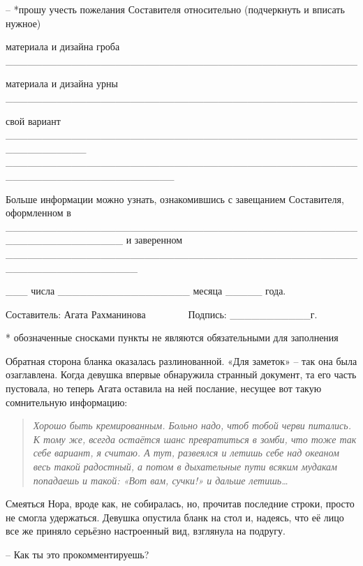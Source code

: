 \documentclass[
  a5paperpaper,
  DIV=11,
  numbers=noendperiod]{scrreprt}
\begin{document}
-- *прошу учесть пожелания Составителя относительно (подчеркнуть и
вписать нужное)

материала и дизайна гроба
\_\_\_\_\_\_\_\_\_\_\_\_\_\_\_\_\_\_\_\_\_\_\_\_\_\_\_\_\_\_\_\_\_\_\_\_\_\_\_\_\_\_\_\_\_\_\_\_

материала и дизайна урны
\_\_\_\_\_\_\_\_\_\_\_\_\_\_\_\_\_\_\_\_\_\_\_\_\_\_\_\_\_\_\_\_\_\_\_\_\_\_\_\_\_\_\_\_\_\_\_\_

свой вариант
\_\_\_\_\_\_\_\_\_\_\_\_\_\_\_\_\_\_\_\_\_\_\_\_\_\_\_\_\_\_\_\_\_\_\_\_\_\_\_\_\_\_\_\_\_\_\_\_\_\_\_\_\_\_\_\_\_\_\_
\_\_\_\_\_\_\_\_\_\_\_\_\_\_\_\_\_\_\_\_\_\_\_\_\_\_\_\_\_\_\_\_\_\_\_\_\_\_\_\_\_\_\_\_\_\_\_\_\_\_\_\_\_\_\_\_\_\_\_\_\_\_\_\_\_\_\_\_\_\_\_

Больше информации можно узнать, ознакомившись с завещанием Составителя,
оформленном в
\_\_\_\_\_\_\_\_\_\_\_\_\_\_\_\_\_\_\_\_\_\_\_\_\_\_\_\_\_\_\_\_\_\_\_\_\_\_\_\_\_\_\_\_\_\_\_\_\_\_\_\_\_\_\_\_\_\_\_\_\_\_\_\_
и заверенном
\_\_\_\_\_\_\_\_\_\_\_\_\_\_\_\_\_\_\_\_\_\_\_\_\_\_\_\_\_\_\_\_\_\_\_\_\_\_\_\_\_\_\_\_\_\_\_\_\_\_\_\_\_\_\_\_\_\_\_\_\_\_\_\_\_\_

\_\_\_ числа \_\_\_\_\_\_\_\_\_\_\_\_\_\_\_\_\_\_ месяца \_\_\_\_\_
года.

Составитель: Агата Рахманинова ~~~~~~~~Подпись: \_\_\_\_\_\_\_\_\_\_\_г.

* обозначенные сносками пункты не являются обязательными для заполнения

Обратная сторона бланка оказалась разлинованной. «Для заметок» -- так
она была озаглавлена. Когда девушка впервые обнаружила странный
документ, та его часть пустовала, но теперь Агата оставила на ней
послание, несущее вот такую сомнительную информацию:

\begin{quote}
\emph{Хорошо быть кремированным. Больно надо, чтоб тобой черви питались.
К тому же, всегда остаётся шанс превратиться в зомби, что тоже так себе
вариант, я считаю. А тут, развеялся и летишь себе над океаном весь такой
радостный, а потом в дыхательные пути всяким мудакам попадаешь и такой:
«Вот вам, сучки!» и дальше летишь\ldots{}}
\end{quote}

Смеяться Нора, вроде как, не собиралась, но, прочитав последние строки,
просто не смогла удержаться. Девушка опустила бланк на стол и, надеясь,
что её лицо все же приняло серьёзно настроенный вид, взглянула на
подругу.

-- Как ты это прокомментируешь?
\end{document}
